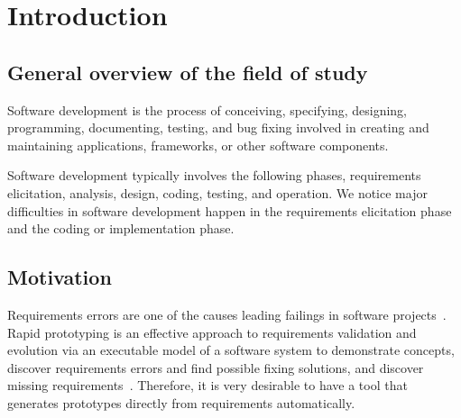 \chapter{Introduction}



\section{General overview of the field of study}
Software development is the process of conceiving, specifying, designing, programming, documenting, testing, and bug fixing involved in creating and maintaining applications, frameworks, or other software components.

Software development typically involves the following phases, requirements elicitation, analysis, design, coding, testing, and operation. We notice major difficulties in software development happen in the requirements elicitation phase and the coding or implementation phase.


\section{Motivation}

Requirements errors are one of the causes leading failings in software projects~\cite{sutcliffe1999tracing}.
Rapid prototyping is an effective approach to requirements validation and evolution via an executable model of a software system to demonstrate concepts, discover requirements errors and find possible fixing solutions, and discover missing requirements~\cite{kordon2002introduction}.
Therefore, it is very desirable to have a tool that generates prototypes directly from requirements automatically.

